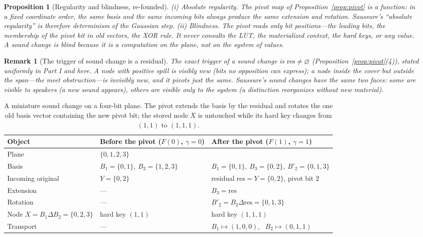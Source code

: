 \documentclass[11pt,a4paper]{article}
\newtheorem{proposition}[principle]{Proposition}
\newtheorem{remark}[principle]{Remark}
\theoremstyle{remark}
\newcommand{\xor}{\ensuremath{\Delta}}                   %
\newcommand{\res}{\ensuremath{\mathrm{res}}}             %
\newcommand{\Gen}{\ensuremath{\gamma}}                   %
\begin{document}
\begin{proposition}[Regularity and blindness, re-founded]
\label{prop:regularity}
(i) \emph{Absolute regularity.} The pivot map of Proposition~\ref{prop:pivot}
is a function: in a fixed coordinate order, the same basis and the same
incoming bits always produce the same extension and rotation. Saussure's
``absolute regularity'' is therefore determinism of the Gaussian step.
(ii) \emph{Blindness.} The pivot reads only bit positions---the leading bits,
the membership of the pivot bit in old vectors, the XOR rule. It never
consults the LUT, the materialized context, the hard keys, or any value.
A sound change is blind because it is a computation on the plane, not on the
system of values.
\end{proposition}

\begin{remark}[The trigger of sound change is a residual]
\label{rem:trigger}
The exact trigger of a sound change is $\res \neq \varnothing$
(Proposition~\ref{prop:pivot}(4)), stated uniformly in Part I \cite{part1}
and here. A node with positive spill is visibly new (bits no opposition can
express); a node inside the cover but outside the span---the meet
obstruction---is invisibly new, and it pivots just the same. Saussure's
sound changes have the same two faces: some are visible to speakers (a new
sound appears), others are visible only to the system (a distinction
reorganizes without new material).
\end{remark}

\begin{table}[htbp]
\centering
\renewcommand{\arraystretch}{1.25}
\begin{tabular}{@{}lll@{}}
\toprule
Object & Before the pivot ($F(0)$, $\Gen=0$) & After the pivot ($F(1)$, $\Gen=1$) \\
\midrule
Plane & \multicolumn{2}{l}{$\{0,1,2,3\}$} \\
Basis & $B_1=\{0,1\},\ B_2=\{1,2,3\}$ &
      $B_1=\{0,1\},\ B_3=\{0,2\},\ B'_2=\{0,1,3\}$ \\
Incoming original & $Y=\{0,2\}$ & residual $\res=Y=\{0,2\}$, pivot bit $2$ \\
Extension & --- & $B_3 = \res$ \\
Rotation & --- & $B'_2 = B_2 \xor \res = \{0,1,3\}$ \\
Node $X = B_1 \xor B_2 = \{0,2,3\}$ & hard key $(1,1)$ & hard key $(1,1,1)$ \\
Transport & --- & $B_1 \mapsto (1,0,0)$, \ $B_2 \mapsto (0,1,1)$ \\
\bottomrule
\end{tabular}
\caption{A miniature sound change on a four-bit plane. The pivot extends the
basis by the residual and rotates the one old basis vector containing the new
pivot bit; the stored node $X$ is untouched while its hard key changes from
$(1,1)$ to $(1,1,1)$.}
\label{tab:pivot}
\end{table}
\end{document}
